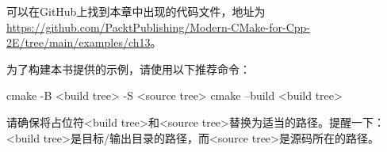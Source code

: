 可以在GitHub上找到本章中出现的代码文件，地址为 \url{https://github.com/PacktPublishing/Modern-CMake-for-Cpp-2E/tree/main/examples/ch13}。

为了构建本书提供的示例，请使用以下推荐命令：

\begin{shell}
cmake -B <build tree> -S <source tree>
cmake --build <build tree>
\end{shell}

请确保将占位符<build tree>和<source tree>替换为适当的路径。提醒一下：<build tree>是目标/输出目录的路径，而<source tree>是源码所在的路径。

